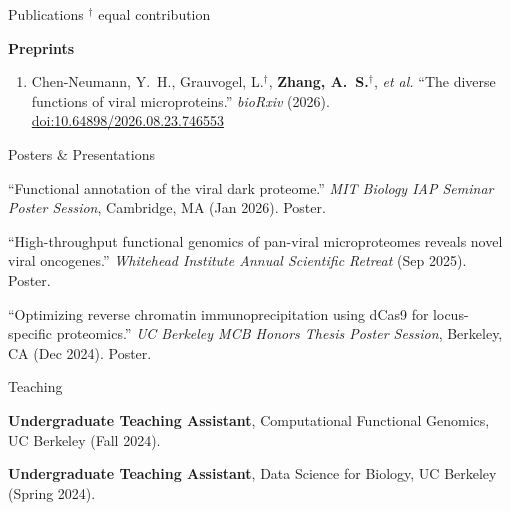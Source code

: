 \documentclass[letterpaper]{cv} %
\begin{document}

\begin{rSection}{Publications}
{\color{notiongray}$^\dagger$ equal contribution}

\textbf{Preprints}
\begin{enumerate}[leftmargin=1.5em, labelsep=0.5em, itemsep=0.1em]
\item[1.] Chen-Neumann, Y.~H., Grauvogel, L.$^\dagger$, \textbf{Zhang, A.~S.}$^\dagger$, \textit{et al.} ``The diverse functions of viral microproteins.'' \textit{bioRxiv} (2026). \href{https://doi.org/10.64898/2026.08.23.746553}{doi:10.64898/2026.08.23.746553}
\end{enumerate}
\end{rSection}


\begin{rSection2}{Posters \& Presentations}
\item ``Functional annotation of the viral dark proteome.'' \textit{MIT Biology IAP Seminar Poster Session}, Cambridge, MA (Jan 2026). Poster.
\item ``High-throughput functional genomics of pan-viral microproteomes reveals novel viral oncogenes.'' \textit{Whitehead Institute Annual Scientific Retreat} (Sep 2025). Poster.
\item ``Optimizing reverse chromatin immunoprecipitation using dCas9 for locus-specific proteomics.'' \textit{UC Berkeley MCB Honors Thesis Poster Session}, Berkeley, CA (Dec 2024). Poster.
\end{rSection2}


\begin{rSection2}{Teaching}
\item \textbf{Undergraduate Teaching Assistant}, Computational Functional Genomics, UC Berkeley (Fall 2024).
\item \textbf{Undergraduate Teaching Assistant}, Data Science for Biology, UC Berkeley (Spring 2024).
\end{rSection2}
\end{document}
